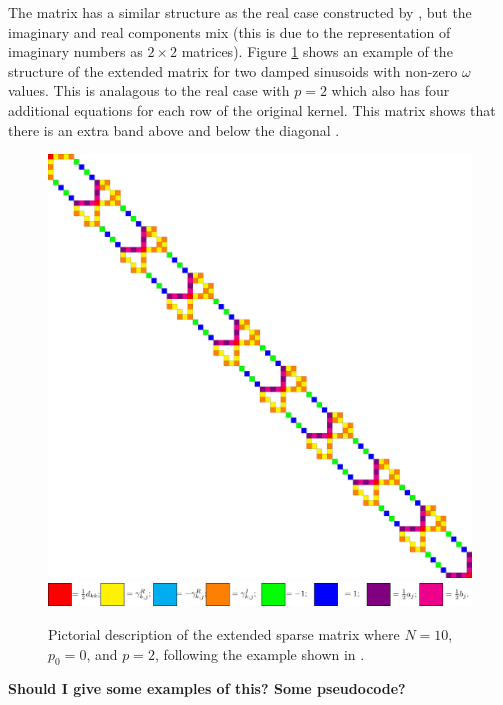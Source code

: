 \documentclass[manuscript, letterpaper]{aastex6}
\newcommand{\figurelabel}[1]{\label{fig:#1}}
\begin{document}
The matrix has a similar structure as the real case constructed by \citep{Ambikasaran:2015}, but the
imaginary and real components mix (this is due to the representation of imaginary numbers as
$2\times 2$ matrices).  Figure \ref{fig:matrix_structure} shows an example of the structure of the extended
matrix for two damped sinusoids with non-zero $\omega$ values.  This is analagous to the real case with
$p=2$ which also has four additional equations for each row of the original kernel.  This matrix shows
that there is an extra band above and below the diagonal \citep[compare with Figure 2 of][]{Ambikasaran:2015}.

\begin{figure}[!htbp]
\begin{center}
\includegraphics[scale=0.175]{./twoterm.pdf}
\hspace{0.2in}
\includegraphics[scale=0.85]{./colorcode.pdf}
\end{center}
\caption{Pictorial description of the extended sparse matrix where $N=10$, $p_0=0$, and $p=2$, following
the example shown in \citet{Ambikasaran:2015}.}
\figurelabel{matrix_structure}
\end{figure}

{\bf Should I give some examples of this?  Some pseudocode?}


\end{document}
